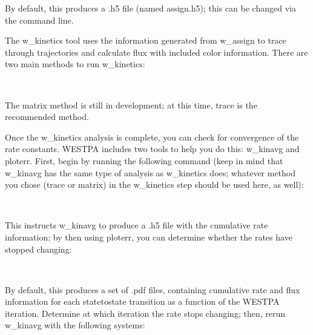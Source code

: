 \documentclass[letterpaper,10pt,english]{sphinxmanual}
\begin{document}
By default, this produces a .h5 file (named assign.h5); this can be changed via
the command line.

The w\_kinetics tool uses the information generated from w\_assign to trace
through trajectories and calculate flux with included color information. There
are two main methods to run w\_kinetics:

\begin{sphinxVerbatim}[commandchars=\\\{\}]
 
 
\end{sphinxVerbatim}

The matrix method is still in development; at this time, trace is the
recommended method.

Once the w\_kinetics analysis is complete, you can check for convergence of the
rate constants. WESTPA includes two tools to help you do this: w\_kinavg and
ploterr. First, begin by running the following command (keep in mind that
w\_kinavg has the same type of analysis as w\_kinetics does; whatever method you
chose (trace or matrix) in the w\_kinetics step should be used here, as well):

\begin{sphinxVerbatim}[commandchars=\\\{\}]
   
\end{sphinxVerbatim}

This instructs w\_kinavg to produce a .h5 file with the cumulative rate
information; by then using ploterr, you can determine whether the rates
have stopped changing:

\begin{sphinxVerbatim}[commandchars=\\\{\}]
 
\end{sphinxVerbatim}

By default, this produces a set of .pdf files, containing cumulative rate and
flux information for each state\sphinxhyphen{}to\sphinxhyphen{}state transition as a function of the WESTPA
iteration. Determine at which iteration the rate stops changing; then, rerun
w\_kinavg with the following systems:

\begin{sphinxVerbatim}[commandchars=\\\{\}]
   
\end{sphinxVerbatim}
\end{document}
